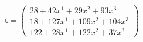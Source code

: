 \documentclass[preview]{standalone}
\begin{document}
\begin{align*}
\mathbf{t} = \begin{pmatrix}28 + 42x^{1} + 29x^{2} + 93x^{3} \\ 18 + 127x^{1} + 109x^{2} + 104x^{3} \\ 122 + 28x^{1} + 122x^{2} + 37x^{3}\end{pmatrix}
\end{align*}
\end{document}
